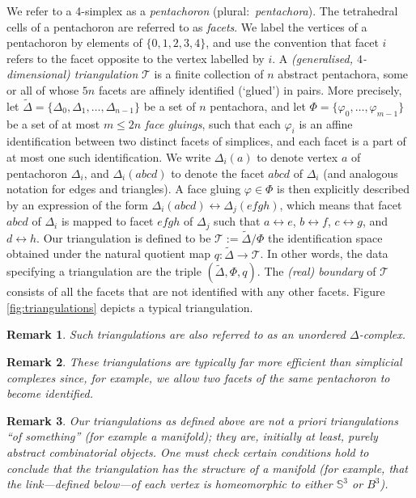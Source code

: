 \documentclass[pdflatex,sn-mathphys-num]{sn-jnl}
\theoremstyle{thmstyleone}%
\theoremstyle{thmstyletwo}%
\newtheorem{remark}{Remark}%
\theoremstyle{thmstylethree}%
\newcommand{\tri}{\mathcal{T}}
\theoremstyle{remark}
\begin{document}
We refer to a 4-simplex as a \emph{pentachoron} (plural:\ \emph{pentachora}). The tetrahedral cells of a pentachoron are referred to as \emph{facets}. We label the vertices of a pentachoron by elements of $\{0,1,2,3,4\}$, and use the convention that facet $i$ refers to the facet opposite to the vertex labelled by $i$. A \emph{(generalised, $4$-dimensional) triangulation} $\tri$ is a finite collection of $n$ abstract pentachora, some or all of whose $5n$ facets are affinely identified (`glued') in pairs. More precisely, let $\widetilde{\Delta}=\{\Delta_0,\Delta_1,\ldots,\Delta_{n-1}\}$ be a set of $n$ pentachora, and let $\Phi=\{\varphi_0,\ldots,\varphi_{m-1}\}$ be a set of at most $m\leq 2n$ \emph{face gluings}, such that each $\varphi_i$ is an affine identification between two distinct facets of simplices, and each facet is a part of at most one such identification. We write $\Delta_i(a)$ to denote vertex $a$ of pentachoron $\Delta_i$, and $\Delta_i(abcd)$ to denote the facet ${abcd}$ of $\Delta_i$ (and analogous notation for edges and triangles). A face gluing $\varphi\in\Phi$ is then explicitly described by an expression of the form $\Delta_i({abcd})\leftrightarrow \Delta_j({efgh})$, which means that facet ${abcd}$ of $\Delta_i$ is mapped to facet ${efgh}$ of $\Delta_j$ such that $a\leftrightarrow e$, $b\leftrightarrow f$, $c\leftrightarrow g$, and $d\leftrightarrow h$. Our triangulation is defined to be $\mathcal{T}:=\widetilde{\Delta}/\Phi$ the identification space obtained under the natural quotient map $q:\widetilde{\Delta}\to \mathcal{T}$. In other words, the data specifying a triangulation are the triple $(\widetilde{\Delta},\Phi,q)$. The \emph{(real) boundary} of $\tri$ consists of all the facets that are not identified with any other facets. Figure \ref{fig:triangulations} depicts a typical triangulation.

\begin{remark}
	Such triangulations are also referred to as an \emph{unordered $\Delta$-complex}.
\end{remark}

\begin{remark}
These triangulations are typically far more efficient than simplicial complexes since, for example, we allow two facets of the same pentachoron to become identified.
\end{remark}

\begin{remark}
	Our triangulations as defined above are not \emph{a priori} triangulations ``of something'' (for example a manifold); they are, initially at least, purely abstract combinatorial objects. One must check certain conditions hold to conclude that the triangulation has the structure of a manifold (for example, that the link---defined below---of each vertex is homeomorphic to either $\mathbb{S}^3$ or $B^3$).
\end{remark}
\end{document}
